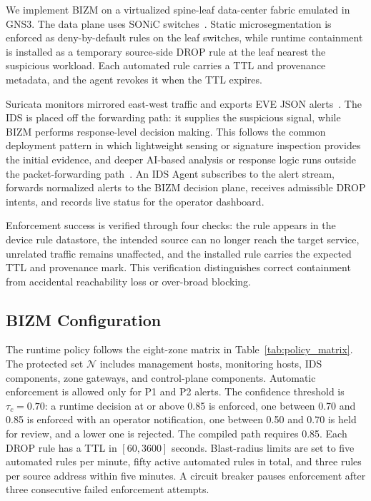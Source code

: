 \documentclass[final,5p]{elsarticle}
\begin{document}
We implement BIZM on a virtualized spine-leaf data-center fabric emulated in GNS3. The data plane uses SONiC switches~\cite{sonic2026}. Static microsegmentation is enforced as deny-by-default rules on the leaf switches, while runtime containment is installed as a temporary source-side DROP rule at the leaf nearest the suspicious workload. Each automated rule carries a TTL and provenance metadata, and the agent revokes it when the TTL expires.

Suricata monitors mirrored east-west traffic and exports EVE JSON alerts~\cite{oisf2026suricata}. The IDS is placed off the forwarding path: it supplies the suspicious signal, while BIZM performs response-level decision making. This follows the common deployment pattern in which lightweight sensing or signature inspection provides the initial evidence, and deeper AI-based analysis or response logic runs outside the packet-forwarding path~\cite{cSDAID22,jSAID23,jAPELID24}. An IDS Agent subscribes to the alert stream, forwards normalized alerts to the BIZM decision plane, receives admissible DROP intents, and records live status for the operator dashboard.

Enforcement success is verified through four checks: the rule appears in the device rule datastore, the intended source can no longer reach the target service, unrelated traffic remains unaffected, and the installed rule carries the expected TTL and provenance mark. This verification distinguishes correct containment from accidental reachability loss or over-broad blocking.

\subsection{BIZM Configuration}
\label{sec:runtime_configuration}

The runtime policy follows the eight-zone matrix in Table~\ref{tab:policy_matrix}. The protected set $\mathcal{N}$ includes management hosts, monitoring hosts, IDS components, zone gateways, and control-plane components. Automatic enforcement is allowed only for P1 and P2 alerts. The confidence threshold is $\tau_c=0.70$: a runtime decision at or above 0.85 is enforced, one between 0.70 and 0.85 is enforced with an operator notification, one between 0.50 and 0.70 is held for review, and a lower one is rejected. The compiled path requires 0.85. Each DROP rule has a TTL in $[60,3600]$ seconds. Blast-radius limits are set to five automated rules per minute, fifty active automated rules in total, and three rules per source address within five minutes. A circuit breaker pauses enforcement after three consecutive failed enforcement attempts.
\end{document}
